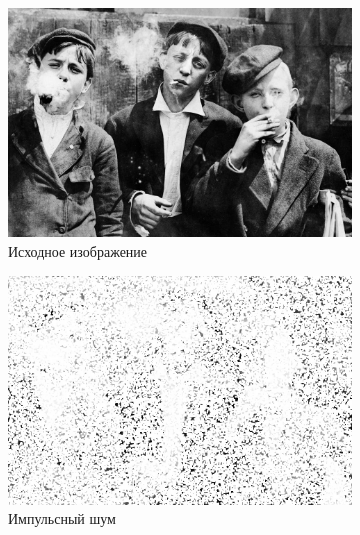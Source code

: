 \begin{figure}[ht] 
    \centering
    \begin{subfigure}[b]{0.5\linewidth}
        \centering
        \includegraphics[width=0.95\linewidth]{../lewis-hine-taschen-main-3.jpg} 
        \caption{Исходное изображение} 
        \label{rang_5_25:a} 
        \vspace{4ex}
    \end{subfigure}%
    \begin{subfigure}[b]{0.5\linewidth}
      \centering
      \includegraphics[width=0.95\linewidth]{../Rang_Filter/Rang_Impulse_noise_(k=5,r=25).jpg} 
      \caption{Импульсный шум} 
      \label{rang_5_25:b} 
      \vspace{4ex}
    \end{subfigure}
    \begin{subfigure}[b]{0.5\linewidth}
      \centering

\end{subfigure}
\end{figure}
